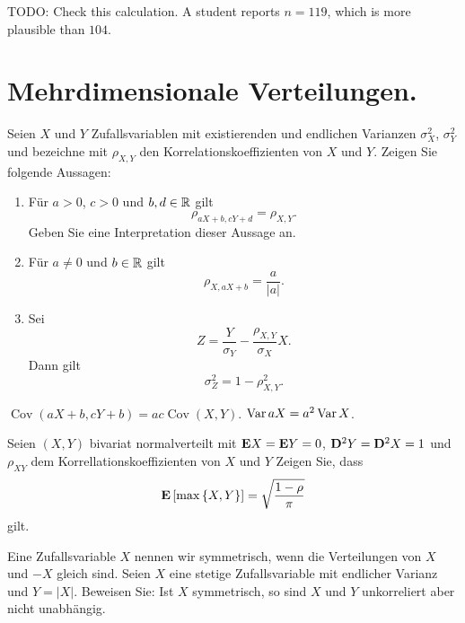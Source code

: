 TODO: Check this calculation. A student reports $n=119$, which is more
plausible than $104$. 


\section{Mehrdimensionale Verteilungen.}

 Seien $X$ und $Y$
Zufallsvariablen mit existierenden und endlichen Varianzen $\sigma^2_{X}$, $\sigma^2_{Y}$ und bezeichne mit
$\rho_{X,Y}$ den Korrelationskoeffizienten von $X$ und $Y$. Zeigen Sie folgende
Aussagen: 
\begin{enumerate}
    \item Für $a>0$, $c>0$ und $b,d\in\mathbb R$ gilt
        \begin{equation*}
            \rho_{aX + b, cY + d} = \rho_{X,Y}.
        \end{equation*}
        Geben Sie eine Interpretation dieser Aussage an. 
    \item Für $a\neq 0$ und $b\in\mathbb R$ gilt
        \begin{equation*}
            \rho_{X, aX+b} = \frac{a}{|a|}.
        \end{equation*}

    \item Sei
        \begin{equation*}
            Z = \frac{Y}{\sigma_{Y}} - \frac{\rho_{X,Y}}{\sigma_{X}} X.
        \end{equation*}
        Dann gilt
        \begin{equation*}
            \sigma^2_{Z} = 1 - \rho^{2}_{X,Y}.
        \end{equation*}
\end{enumerate}

\solution$\operatorname{Cov}(aX+b, cY + b)= ac
\operatorname{Cov}(X,Y)$. $\operatorname{Var} aX = a^2 \operatorname{Var} X$. 

 Seien $(X,Y)$ bivariat normalverteilt
mit $\mathbf E X=\mathbf E Y=0$, $\mathbf D^{2}Y=\mathbf D^{2}X=1$ und $\rho_{XY}$ dem Korrellationskoeffizienten
von $X$ und $Y$
Zeigen Sie, dass
\begin{equation*}
    \mathbf E \left[ \max\left\{ X,Y \right\} \right] = \sqrt{\frac{1-\rho}{\pi}}
\end{equation*}
gilt.

 Eine Zufallsvariable $X$ nennen wir
symmetrisch, wenn die Verteilungen von $X$ und $-X$ gleich sind. Seien $X$ eine
stetige Zufallsvariable mit endlicher Varianz und $Y = |X|$. Beweisen Sie: Ist $X$
symmetrisch, so sind $X$ und $Y$ unkorreliert aber nicht unabhängig.

